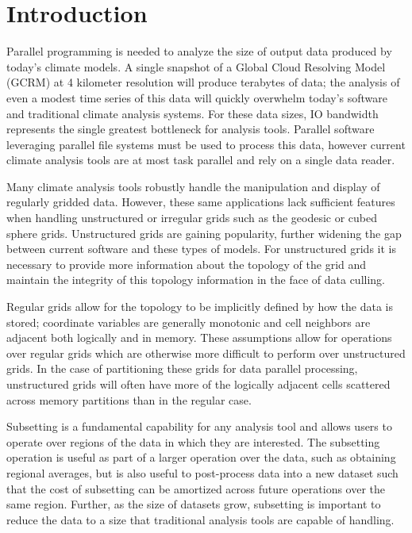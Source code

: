 \section{Introduction}
\label{section:introduction}

Parallel programming is needed to analyze the size of output data produced by
today's climate models\cite{MODSIM07:LOT,WASHINGTON08}.  A single snapshot of
a Global Cloud Resolving Model (GCRM) at 4 kilometer resolution will produce
terabytes of data\cite{GCRM}; the analysis of even a modest time series of
this data will quickly overwhelm today's software and traditional climate
analysis systems.  For these data sizes, IO bandwidth represents the single
greatest bottleneck for analysis tools.  Parallel software leveraging parallel
file systems must be used to process this data, however current climate
analysis tools are at most task parallel and rely on a single data
reader\cite{CDAT,CDO,NCO}.

Many climate analysis tools robustly handle the manipulation and display of
regularly gridded data.  However, these same applications lack sufficient
features when handling unstructured or irregular grids such as the
geodesic\cite{GEODESIC} or cubed sphere\cite{CUBE} grids.  Unstructured grids
are gaining popularity, further widening the gap between current software and
these types of models.  For unstructured grids it is necessary to provide more
information about the topology of the grid and maintain the integrity of this
topology information in the face of data culling.

Regular grids allow for the topology to be implicitly defined by how
the data is stored; coordinate variables are generally monotonic and cell
neighbors are adjacent both logically and in memory.  These assumptions allow
for operations over regular grids which are otherwise more difficult to
perform over unstructured grids.  In the case of partitioning these grids for
data parallel processing, unstructured grids will often have more of the
logically adjacent cells scattered across memory partitions than in the
regular case.

Subsetting is a fundamental capability for any analysis tool and allows users
to operate over regions of the data in which they are interested.  The
subsetting operation is useful as part of a larger operation over the data,
such as obtaining regional averages, but is also useful to post-process data
into a new dataset such that the cost of subsetting can be amortized across
future operations over the same region.  Further, as the size of datasets
grow, subsetting is important to reduce the data to a size that traditional
analysis tools are capable of handling. 

